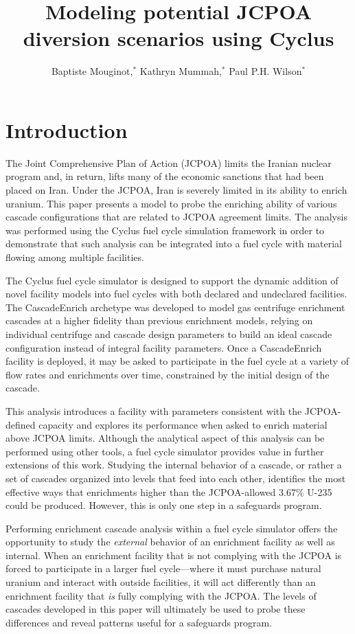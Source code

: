 \documentclass{anstrans}
\title{Modeling potential JCPOA diversion scenarios using Cyclus}
\author{Baptiste Mouginot,$^{*}$ Kathryn Mummah,$^{*}$ Paul P.H. Wilson$^{*}$}
\institute{
$^{*}$University of Wisconsin-Madison, WI
}
\begin{document}
\section{Introduction}

The Joint Comprehensive Plan of Action (JCPOA)\cite{jcpoa} %
limits the Iranian nuclear program and, in return, lifts many of the economic
sanctions that had been placed on Iran. Under the JCPOA, Iran is severely
limited in its ability to enrich uranium. This paper presents a model to probe
the enriching ability of various cascade configurations that are related to
JCPOA agreement limits. The analysis was performed using the Cyclus fuel cycle
\cite{cyclus} %
simulation framework in order to demonstrate that such analysis can be
integrated into a fuel cycle with material flowing among multiple facilities.

The Cyclus fuel cycle simulator is designed to support the dynamic addition of
novel facility models into fuel cycles with both declared and undeclared facilities.
The CascadeEnrich archetype\cite{mbmore.2018} was developed to model gas centrifuge
enrichment cascades at a higher fidelity than previous enrichment models,
relying on individual centrifuge and cascade design parameters to build an ideal
cascade configuration instead of integral facility parameters. Once a
CascadeEnrich facility is deployed, it may be asked to participate in the fuel
cycle at a variety of flow rates and enrichments over time, constrained by the
initial design of the cascade.

This analysis introduces a facility with parameters consistent with the
JCPOA-defined capacity and explores its performance when asked to enrich
material above JCPOA limits. Although the analytical aspect of this analysis can
be performed using other tools, a fuel cycle simulator provides value in further
extensions of this work. Studying the internal behavior of a cascade, or rather
a set of cascades organized into levels that feed into each other, identifies
the most effective ways that enrichments higher than the JCPOA-allowed 3.67\%
U-235 could be produced. However, this is only one step in a safeguards program.

Performing enrichment cascade analysis within a fuel cycle simulator offers the
opportunity to study the \textit{external} behavior of an enrichment facility as
well as internal. When an enrichment facility that is not complying with the
JCPOA is forced to participate in a larger fuel cycle---where it must purchase
natural uranium and interact with outside facilities, it will act differently
than an enrichment facility that \textit{is} fully complying with the JCPOA. The
levels of cascades developed in this paper will ultimately be used to probe
these differences and reveal patterns useful for a safeguards program.
\end{document}

